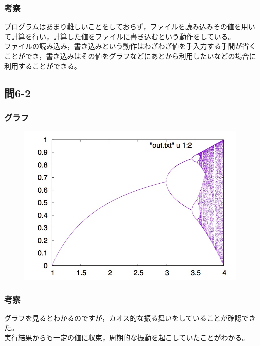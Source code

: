 \documentclass{jarticle}
\begin{document}
\subsubsection{考察\\}
プログラムはあまり難しいことをしておらず，ファイルを読み込みその値を用いて計算を行い，計算した値をファイルに書き込むという動作をしている。\\
ファイルの読み込み，書き込みという動作はわざわざ値を手入力する手間が省くことができ，書き込みはその値をグラフなどにあとから利用したいなどの場合に利用することができる。\\

\subsection{問6-2\\}
\subsubsection{グラフ\\}
\begin{figure}[htb]
 \begin{center}
 \includegraphics[clip, width=15cm]{6-2.jpg} 
  \label{fig:level}
 \end{center}
\end{figure}
\subsubsection{考察\\}
グラフを見るとわかるのですが，カオス的な振る舞いをしていることが確認できた。\\
実行結果からも一定の値に収束，周期的な振動を起こしていたことがわかる。\\
\end{document}
